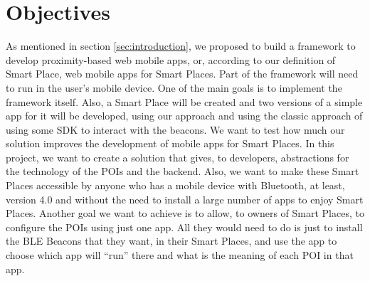 
% 
% 

\section{Objectives}
\label{sec:objectives}

As mentioned in section \ref{sec:introduction}, we proposed
to build a framework to develop proximity-based web mobile
apps, or, according to our definition of Smart Place, web
mobile apps for Smart Places.
Part of the framework will need to run in the user's 
mobile device.
One of the main goals is to implement the framework itself.
Also, a Smart Place will be created and 
two versions of a simple
app for it will be developed, using our approach and using the classic approach
of using some SDK to interact with the beacons.
We want to test how much our solution improves the
development of mobile apps for Smart Places.
In this project, we want to create a solution that
gives, to developers, abstractions for the technology
of the POIs and the backend.
Also, we want to make these Smart Places accessible by 
anyone who has a mobile device with Bluetooth, at least,
version 4.0 and without the need to install a large number
of apps to enjoy Smart Places.
Another goal we want to achieve is to allow, to owners of
Smart Places, to configure the POIs using just one app.
All they would need to do is just to install the BLE Beacons
that they want, in their Smart Places, and use the app
to choose which app will ``run'' there and what is the meaning
of each POI in that app.




